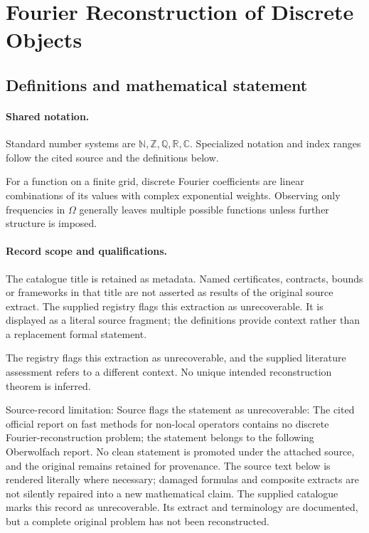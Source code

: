 \documentclass[11pt]{article}
\begin{document}
\section{Fourier Reconstruction of Discrete Objects}\label{statement}

\subsection{Definitions and mathematical statement}

\paragraph{Shared notation.}Standard number systems are $\mathbb N,\mathbb Z,\mathbb Q,\mathbb R,\mathbb C$. Specialized notation and index ranges follow the cited source and the definitions below.


For a function on a finite grid, discrete Fourier coefficients are linear combinations of its values with complex exponential weights. Observing only frequencies in $\Omega$ generally leaves multiple possible functions unless further structure is imposed.
\paragraph{Record scope and qualifications.}
The catalogue title is retained as metadata. Named certificates, contracts, bounds or frameworks in that title are not asserted as results of the original source extract.
The supplied registry flags this extraction as unrecoverable. It is displayed as a literal source fragment; the definitions provide context rather than a replacement formal statement.

The registry flags this extraction as unrecoverable, and the supplied literature assessment refers to a different context. No unique intended reconstruction theorem is inferred.

Source-record limitation: Source flags the statement as unrecoverable: The cited official report on fast methods for non-local operators contains no discrete Fourier-reconstruction problem; the statement belongs to the following Oberwolfach report. No clean statement is promoted under the attached source, and the original remains retained for provenance.
The source text below is rendered literally where necessary; damaged formulas and composite extracts are not silently repaired into a new mathematical claim.
The supplied catalogue marks this record as unrecoverable. Its extract and terminology are documented, but a complete original problem has not been reconstructed.
\end{document}
